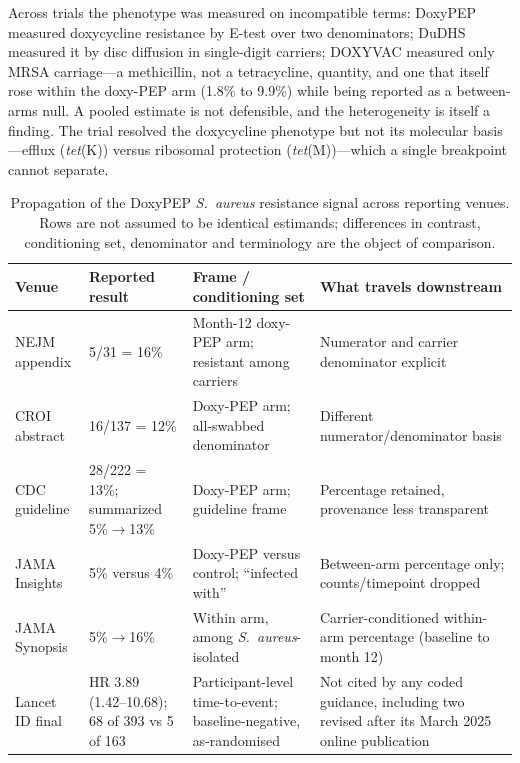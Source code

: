 \documentclass[12pt,a4paper]{article}
\newcommand{\sa}{\emph{S.~aureus}}
\begin{document}
Across trials the phenotype was measured on incompatible terms: DoxyPEP measured
doxycycline resistance by E-test over two denominators; DuDHS measured it by disc
diffusion in single-digit carriers; DOXYVAC measured only MRSA carriage---a
methicillin, not a tetracycline, quantity, and one that itself rose within the
doxy-PEP arm (1.8\% to 9.9\%) while being reported as a between-arms
null.\cite{vanbaelen2024c} A pooled estimate is not defensible, and the
heterogeneity is itself a finding. The trial resolved the doxycycline phenotype
but not its molecular basis---efflux (\emph{tet}(K)) versus ribosomal protection
(\emph{tet}(M))---which a single breakpoint cannot separate.\cite{liu2011,grossman2016}

\begin{table}[t]
\centering
\caption{Propagation of the DoxyPEP \sa{} resistance signal across reporting
venues. Rows are not assumed to be identical estimands; differences in contrast,
conditioning set, denominator and terminology are the object of comparison.}
\label{tab:propagation}
\small
\begin{tabularx}{\textwidth}{@{}lllX@{}}
\toprule
Venue & Reported result & Frame / conditioning set & What travels downstream\\
\midrule
NEJM appendix\cite{luetkemeyer2023} & 5/31 = 16\% & Month-12 doxy-PEP arm; resistant among carriers & Numerator and carrier denominator explicit\\
CROI abstract\cite{luetkemeyer2023croi} & 16/137 = 12\% & Doxy-PEP arm; all-swabbed denominator & Different numerator/denominator basis\\
CDC guideline\cite{cdc2024doxypep} & 28/222 = 13\%; summarized 5\%$\rightarrow$13\% & Doxy-PEP arm; guideline frame & Percentage retained, provenance less transparent\\
JAMA Insights\cite{mayer2023} & 5\% versus 4\% & Doxy-PEP versus control; ``infected with'' & Between-arm percentage only; counts/timepoint dropped\\
JAMA Synopsis\cite{flores2025} & 5\%$\rightarrow$16\% & Within arm, among \sa{}-isolated & Carrier-conditioned within-arm percentage (baseline to month 12)\\
Lancet ID final\cite{luetkemeyer2025} & HR 3.89 (1.42--10.68); 68 of 393 vs 5 of 163 & Participant-level time-to-event; baseline-negative, as-randomised & Not cited by any coded guidance, including two revised after its March 2025 online publication\\
\bottomrule
\end{tabularx}
\end{table}
\end{document}
